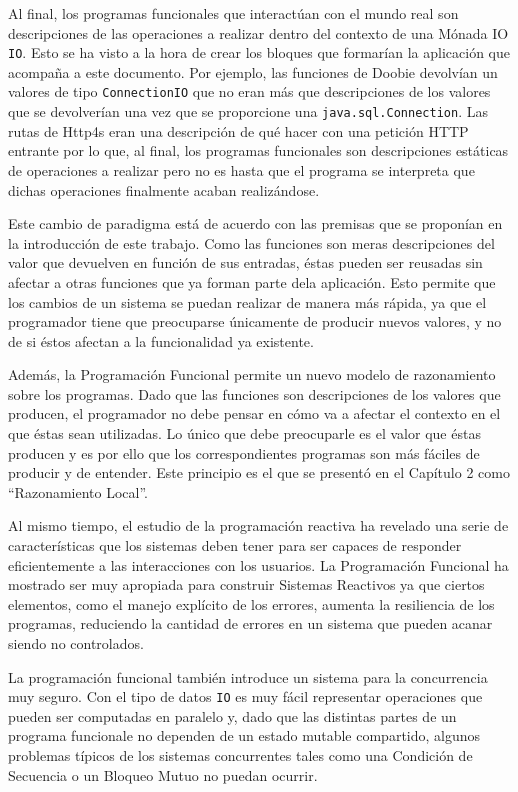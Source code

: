 \documentclass[../main.tex]{subfiles}
\begin{document}
Al final, los programas funcionales que interactúan con el mundo real son descripciones de
las operaciones a realizar dentro del contexto de una Mónada IO \texttt{IO}. Esto se ha visto
a la hora de crear los bloques que formarían la aplicación que acompaña a este documento. Por ejemplo,
las funciones de Doobie devolvían un valores de tipo \texttt{ConnectionIO} que no eran más que
descripciones de los valores que se devolverían una vez que se proporcione una \texttt{java.sql.Connection}.
Las rutas de Http4s eran una descripción de qué hacer con una petición HTTP entrante por lo que, al
final, los programas funcionales son descripciones estáticas de operaciones a realizar pero
no es hasta que el programa se interpreta que dichas operaciones finalmente acaban realizándose.

Este cambio de paradigma está de acuerdo con las premisas que se proponían en la introducción de este trabajo. 
Como las funciones son meras descripciones del valor que devuelven en función de sus entradas, éstas
pueden ser reusadas sin afectar a otras funciones que ya forman parte dela aplicación. Esto permite
que los cambios de un sistema se puedan realizar de manera más rápida, ya que el programador tiene que 
preocuparse únicamente de producir nuevos valores, y no de si éstos afectan a la funcionalidad ya existente.

Además, la Programación Funcional permite un nuevo modelo de razonamiento sobre los
programas. Dado que las funciones son descripciones de los valores que producen, el
programador no debe pensar en cómo va a afectar el contexto en el que éstas sean utilizadas. Lo 
único que debe preocuparle es el valor que éstas producen y es
por ello que los correspondientes programas son más fáciles de producir y de entender. Este principio es
el que se presentó en el Capítulo 2 como ``Razonamiento Local''.

Al mismo tiempo, el estudio de la programación reactiva ha revelado una serie de
características que los sistemas deben tener para ser capaces de responder eficientemente a 
las interacciones con los usuarios.
La Programación Funcional ha mostrado ser muy apropiada para construir Sistemas Reactivos ya que 
ciertos elementos, como el manejo explícito de los errores, aumenta la resiliencia de
los programas, reduciendo la cantidad de errores en un sistema que pueden acanar siendo no controlados.

La programación funcional también introduce un sistema para la concurrencia muy seguro.
Con el tipo de datos \texttt{IO} es muy fácil representar operaciones que pueden ser
computadas en paralelo y, dado que las distintas partes de un programa funcionale no dependen de un estado
mutable compartido, algunos problemas típicos de los sistemas concurrentes tales como una 
Condición de Secuencia o un Bloqueo Mutuo no puedan ocurrir.
\end{document}
